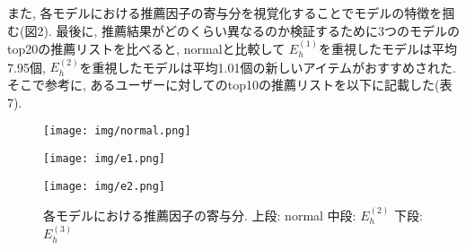 \documentclass[a4j,11pt]{jarticle}           %
\begin{document}
	また, 各モデルにおける推薦因子の寄与分を視覚化することでモデルの特徴を掴む(図2). 
	最後に, 推薦結果がどのくらい異なるのか検証するために3つのモデルのtop20の推薦リストを比べると, normalと比較して
	$E_h^{(1)}$を重視したモデルは平均7.95個, $E_h^{(2)}$を重視したモデルは平均1.01個の新しいアイテムがおすすめされた. そこで参考に, あるユーザーに対してのtop10の推薦リストを以下に記載した(表7). 
	
	\begin{figure}[H]
		\centering
		\texttt{[image: img/normal.png]}
	\end{figure}
	
	\begin{figure}[H]
		\centering
		\texttt{[image: img/e1.png]}
	\end{figure}
	\begin{figure}[H]
		\centering
		\texttt{[image: img/e2.png]}
		\caption{各モデルにおける推薦因子の寄与分. 上段: normal 中段: $E_h^{(2)}$ 下段: $E_h^{(3)}$ }
	\end{figure}
	
	
	
\end{document}
